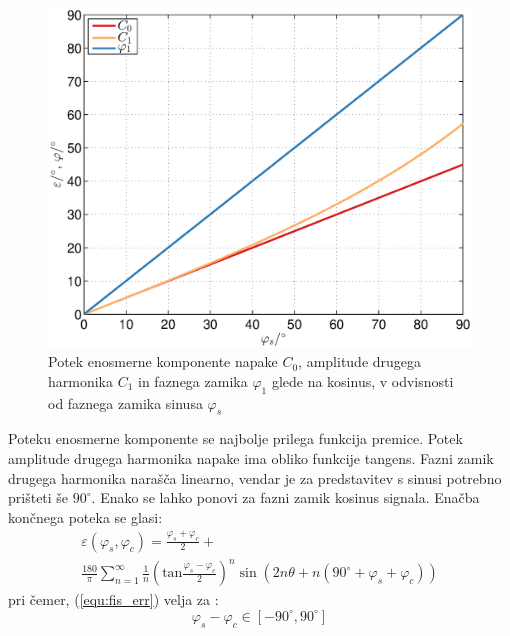 \documentclass[a4paper]{article}
\begin{document}
\begin{figure}[!htb]
	\begin{center}
		\includegraphics[width=\linewidth]{./Slike/fis.eps}
		\caption{Potek enosmerne komponente napake $C_0$, amplitude drugega harmonika $C_1$ in faznega zamika $\varphi_1$ glede na kosinus, v odvisnosti od faznega zamika sinusa $\varphi_{s}$} \label{fig:fis}
	\end{center}
\end{figure}
Poteku enosmerne komponente se najbolje prilega funkcija premice.
Potek amplitude drugega harmonika napake ima obliko funkcije tangens.
Fazni zamik drugega harmonika narašča linearno, vendar je za predstavitev s sinusi potrebno prišteti še $90^\circ$. Enako se lahko ponovi za fazni zamik kosinus signala.
Enačba končnega poteka se glasi:
\begin{multline}
\label{equ:fis_err}
\varepsilon(\varphi_{s},\varphi_{c}) = \frac{\varphi_{s}+\varphi_{c}}{2}+\\ \frac{180}{\pi}\sum_{n=1}^{\infty}\frac{1}{n} (\mathrm{tan}\frac{\varphi_{s}-\varphi_{c}}{2})^n \sin (2n \theta+n(90^\circ +\varphi_{s}+\varphi_{c}))
\end{multline}
pri čemer, (\ref{equ:fis_err}) velja za :
$$ \varphi_{s}-\varphi_{c} \in [ -90^\circ , 90^\circ ] $$
\end{document}

